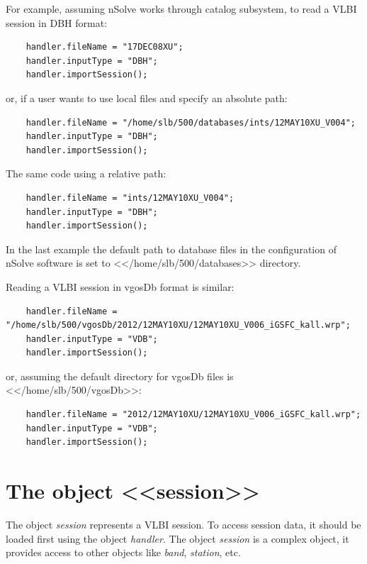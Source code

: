 \documentclass [10pt,letterpaper]{report}
\newcommand{\nuSolve}{\greektext n\latintext Solve}
\begin{document}
For example, assuming \nuSolve{} works through catalog subsystem, to read a VLBI session in DBH format:
{\small\begin{verbatim}
    handler.fileName = "17DEC08XU";
    handler.inputType = "DBH";
    handler.importSession();
\end{verbatim}}
\noindent
or, if a user wants to use local files and specify an absolute path:
{\small\begin{verbatim}
    handler.fileName = "/home/slb/500/databases/ints/12MAY10XU_V004";
    handler.inputType = "DBH";
    handler.importSession();
\end{verbatim}}
\noindent
The same code using a relative path:
{\small\begin{verbatim}
    handler.fileName = "ints/12MAY10XU_V004";
    handler.inputType = "DBH";
    handler.importSession();
\end{verbatim}}
\noindent
In the last example the default path to database files in the configuration of \nuSolve{} software
is set to <</home/slb/500/databases>> directory.

Reading a VLBI session in vgosDb format is similar:
{\small\begin{verbatim}
    handler.fileName = "/home/slb/500/vgosDb/2012/12MAY10XU/12MAY10XU_V006_iGSFC_kall.wrp";
    handler.inputType = "VDB";
    handler.importSession();
\end{verbatim}}
\noindent
or, assuming the default directory for vgosDb files is <</home/slb/500/vgosDb>>:
{\small\begin{verbatim}
    handler.fileName = "2012/12MAY10XU/12MAY10XU_V006_iGSFC_kall.wrp";
    handler.inputType = "VDB";
    handler.importSession();
\end{verbatim}}
\noindent




\section{The object <<session>>}
\label{section-scripting-session}

The object {\sl session} represents a VLBI session. To access session data, it should be
loaded first using the object {\sl handler}. The object {\sl session} is a complex object,
it provides access to other objects like {\sl band}, {\sl station}, etc.
\end{document}
